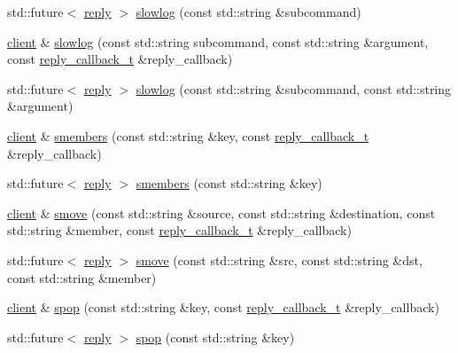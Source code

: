\begin{DoxyCompactItemize}
\item 
std\+::future$<$ \hyperlink{classcpp__redis_1_1reply}{reply} $>$ \hyperlink{classcpp__redis_1_1client_a73f52f578ac8f266eb6e2b1f2a9cfdff}{slowlog} (const std\+::string \&subcommand)
\item 
\hyperlink{classcpp__redis_1_1client}{client} \& \hyperlink{classcpp__redis_1_1client_a62bc37eb1ef8a3b09ca58c091085c89b}{slowlog} (const std\+::string subcommand, const std\+::string \&argument, const \hyperlink{classcpp__redis_1_1client_a061a1140d36d2eaeda82b09a0bb3f9f2}{reply\+\_\+callback\+\_\+t} \&reply\+\_\+callback)
\item 
std\+::future$<$ \hyperlink{classcpp__redis_1_1reply}{reply} $>$ \hyperlink{classcpp__redis_1_1client_a4b3b0c8b11cc1e7f0bdb827eba6f7dc3}{slowlog} (const std\+::string \&subcommand, const std\+::string \&argument)
\item 
\hyperlink{classcpp__redis_1_1client}{client} \& \hyperlink{classcpp__redis_1_1client_a83458f3cff3680410d34f263cd9f30bc}{smembers} (const std\+::string \&key, const \hyperlink{classcpp__redis_1_1client_a061a1140d36d2eaeda82b09a0bb3f9f2}{reply\+\_\+callback\+\_\+t} \&reply\+\_\+callback)
\item 
std\+::future$<$ \hyperlink{classcpp__redis_1_1reply}{reply} $>$ \hyperlink{classcpp__redis_1_1client_a4cdd71bfb45eb37c593d6733ba83f09a}{smembers} (const std\+::string \&key)
\item 
\hyperlink{classcpp__redis_1_1client}{client} \& \hyperlink{classcpp__redis_1_1client_a0768130822a976cfa3e27310c7a14417}{smove} (const std\+::string \&source, const std\+::string \&destination, const std\+::string \&member, const \hyperlink{classcpp__redis_1_1client_a061a1140d36d2eaeda82b09a0bb3f9f2}{reply\+\_\+callback\+\_\+t} \&reply\+\_\+callback)
\item 
std\+::future$<$ \hyperlink{classcpp__redis_1_1reply}{reply} $>$ \hyperlink{classcpp__redis_1_1client_a4524b915c1180a4c57ffb16f660108ba}{smove} (const std\+::string \&src, const std\+::string \&dst, const std\+::string \&member)
\item 
\hyperlink{classcpp__redis_1_1client}{client} \& \hyperlink{classcpp__redis_1_1client_a9a59ca9396d1447ae3a8bb584449e174}{spop} (const std\+::string \&key, const \hyperlink{classcpp__redis_1_1client_a061a1140d36d2eaeda82b09a0bb3f9f2}{reply\+\_\+callback\+\_\+t} \&reply\+\_\+callback)
\item 
std\+::future$<$ \hyperlink{classcpp__redis_1_1reply}{reply} $>$ \hyperlink{classcpp__redis_1_1client_aabd8e3ddf02299eb129af8ad27555282}{spop} (const std\+::string \&key)

\end{DoxyCompactItemize}
